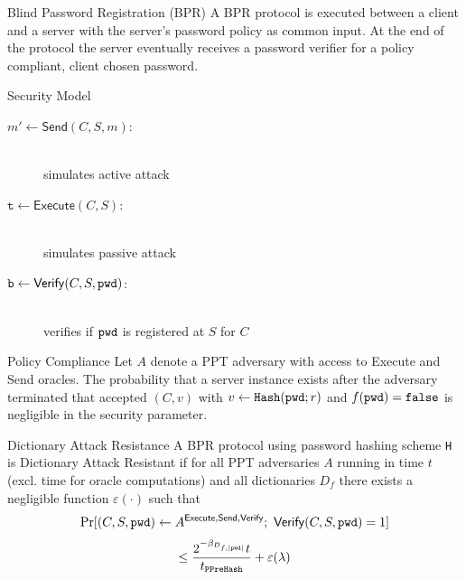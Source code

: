 \documentclass[notes,xcolor=dvipsnames]{beamer}
\begin{document}
\begin{frame}{Blind Password Registration (BPR)}
  A BPR protocol is executed between a client and a server with the server's password policy as common input.
  At the end of the protocol the server eventually receives a password verifier for a policy compliant, client chosen password.
\end{frame}

\begin{frame}{Security Model}

  \begin{description}
    \item[$m'\gets\mathsf{Send}(C,S,m)$:] \hfill \\ simulates active attack
    \item[$\mathtt{t}\gets\mathsf{Execute}(C,S)$:] \hfill \\ simulates passive attack
    \item[$\mathtt{b}\gets\mathsf{Verify}(C,S,\mathtt{pwd})$:] \hfill \\ verifies if $\mathtt{pwd}$ is registered at $S$ for $C$
  \end{description}

\end{frame}

\begin{frame}{Policy Compliance}
  Let $A$ denote a PPT adversary with access to Execute and Send oracles. The probability that a server instance exists after the adversary terminated that accepted $(C, v)$ with $v \gets \mathtt{Hash}(\mathtt{pwd}; r)$ and $f(\mathtt{pwd})=\mathtt{false}$ is negligible in the security parameter.
\end{frame}

\begin{frame}{Dictionary Attack Resistance}
  A BPR protocol using password hashing scheme \texttt{H} is Dictionary Attack Resistant if for all PPT adversaries $A$ running in time $t$ (excl. time for oracle computations) and all dictionaries $D_f$ there exists a negligible function $\varepsilon(\cdot)$ such that
  \[
    \Pr[(C, S, \mathtt{pwd}) \gets A^{\mathsf{Execute},\mathsf{Send},\mathsf{Verify}}; ~ \mathsf{Verify}(C, S, \mathtt{pwd})=1]
  \]
  \[
    \leq \frac{2^{-\beta_{D_{f,|\mathtt{pwd}|}}}t}{t_{\mathtt{PPreHash}}} + \varepsilon(\lambda)
  \]
\end{frame}
\end{document}

